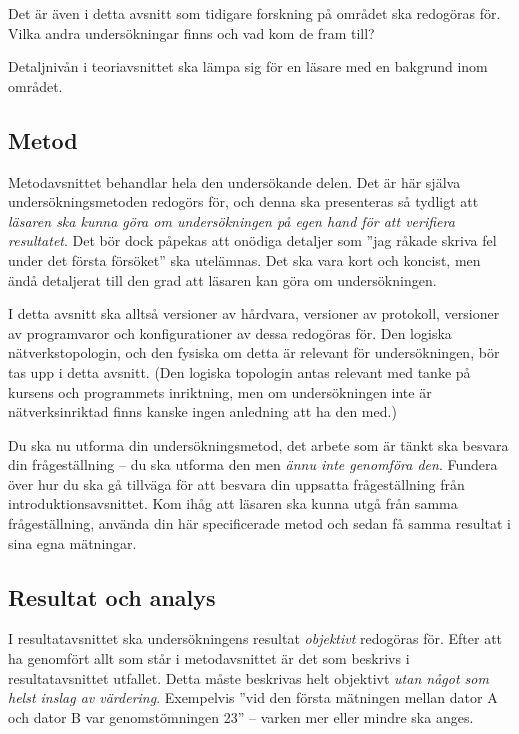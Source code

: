 \documentclass[a4paper,nocourse]{miunasgn}
\begin{document}
Det är även i detta avsnitt som tidigare forskning på området ska redogöras 
för.
Vilka andra undersökningar finns och vad kom de fram till?

Detaljnivån i teoriavsnittet ska lämpa sig för en läsare med en bakgrund inom 
området.

\subsection{Metod}

Metodavsnittet behandlar hela den undersökande delen.
Det är här själva undersökningsmetoden redogörs för, och denna ska presenteras 
så tydligt att \emph{läsaren ska kunna göra om undersökningen på egen hand för 
att verifiera resultatet}.
Det bör dock påpekas att onödiga detaljer som ''jag råkade skriva fel under det 
första försöket'' ska utelämnas.
Det ska vara kort och koncist, men ändå detaljerat till den grad att läsaren 
kan göra om undersökningen.

I detta avsnitt ska alltså versioner av hårdvara, versioner av protokoll, 
versioner av programvaror och konfigurationer av dessa redogöras för.
Den logiska nätverkstopologin, och den fysiska om detta är relevant för 
undersökningen, bör tas upp i detta avsnitt.
(Den logiska topologin antas relevant med tanke på kursens och programmets 
inriktning, men om undersökningen inte är nätverksinriktad finns kanske ingen 
anledning att ha den med.)

Du ska nu utforma din undersökningsmetod, det arbete som är tänkt ska besvara 
din frågeställning -- du ska utforma den men \emph{ännu inte genomföra den}.
Fundera över hur du ska gå tillväga för att besvara din uppsatta frågeställning 
från introduktionsavsnittet.
Kom ihåg att läsaren ska kunna utgå från samma frågeställning, använda din här 
specificerade metod och sedan få samma resultat i sina egna mätningar.

\subsection{Resultat och analys}

I resultatavsnittet ska undersökningens resultat \emph{objektivt} redogöras 
för.
Efter att ha genomfört allt som står i metodavsnittet är det som beskrivs 
i resultatavsnittet utfallet.
Detta måste beskrivas helt objektivt \emph{utan något som helst inslag av 
värdering}.
Exempelvis ''vid den första mätningen mellan dator A och dator B var 
genomstömningen \unit{23}{\mega\bit\per\second}'' -- varken mer eller mindre 
ska anges.
\end{document}
